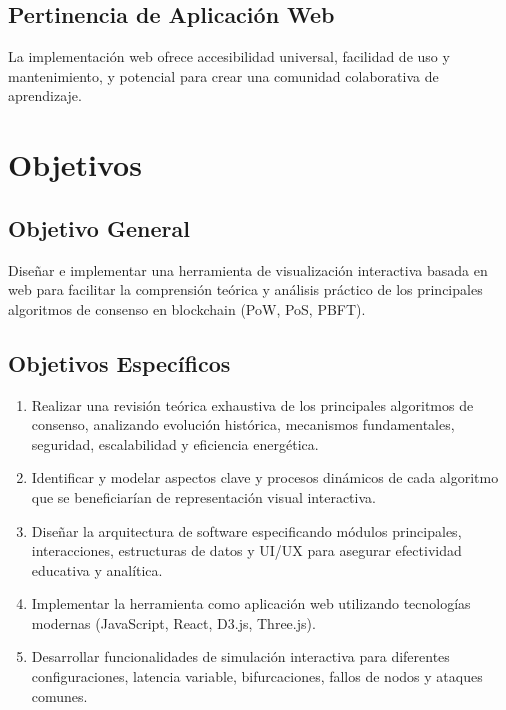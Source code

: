 \documentclass[spanish,12pt,letterpaper]{report}
\begin{document}
\subsection{Pertinencia de Aplicación Web}
La implementación web ofrece accesibilidad universal, facilidad de uso y mantenimiento, y potencial para crear una comunidad colaborativa de aprendizaje.

\section{Objetivos}
\subsection{Objetivo General}
Diseñar e implementar una herramienta de visualización interactiva basada en web para facilitar la comprensión teórica y análisis práctico de los principales algoritmos de consenso en blockchain (PoW, PoS, PBFT).

\subsection{Objetivos Específicos}
\begin{enumerate}
    \item Realizar una revisión teórica exhaustiva de los principales algoritmos de consenso, analizando evolución histórica, mecanismos fundamentales, seguridad, escalabilidad y eficiencia energética.
    
    \item Identificar y modelar aspectos clave y procesos dinámicos de cada algoritmo que se beneficiarían de representación visual interactiva.
    
    \item Diseñar la arquitectura de software especificando módulos principales, interacciones, estructuras de datos y UI/UX para asegurar efectividad educativa y analítica.
    
    \item Implementar la herramienta como aplicación web utilizando tecnologías modernas (JavaScript, React, D3.js, Three.js).
    
    \item Desarrollar funcionalidades de simulación interactiva para diferentes configuraciones, latencia variable, bifurcaciones, fallos de nodos y ataques comunes.

\end{enumerate}
\end{document}
